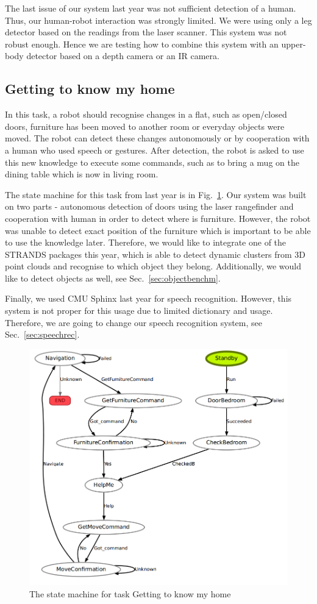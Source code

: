 The last issue of our system last year was not sufficient detection of a human. Thus, our human-robot interaction was strongly limited. 
We were using only a leg detector based on the readings from the laser scanner. 
This system was not robust enough. 
Hence we are testing how to combine this system with an upper-body detector based on a depth camera or an IR camera.

\subsection{Getting to know my home}

In this task, a robot should recognise changes in a flat, such as open/closed doors, furniture has been moved to another room or everyday objects were moved. 
The robot can detect these changes autonomously or by cooperation with a human who used speech or gestures.
After detection, the robot is asked to use this new knowledge to execute some commands, such as to bring a mug on the dining table which is now in living room.

The state machine for this task from last year is in Fig.~\ref{fig:st1}.
Our system was built on two parts - autonomous detection of doors using the laser rangefinder and cooperation with human in order to detect where is furniture. 
 However, the robot was unable to detect exact position of the furniture which is important to be able to use the knowledge later. 
Therefore, we would like to integrate one of the STRANDS packages this year, which is able to detect dynamic clusters from 3D point clouds and recognise to which object they belong. 
Additionally, we would like to detect objects as well, see Sec.~\ref{sec:objectbenchm}.

Finally, we used CMU Sphinx last year for speech recognition. 
However, this system is not proper for this usage due to limited dictionary and usage. 
Therefore, we are going to change our speech recognition system, see Sec.~\ref{sec:speechrec}.

\begin{figure}[!htb]
\centering
\includegraphics[width=3.in]{statemachine_t1.png}
\caption{The state machine for task Getting to know my home}
\label{fig:st1}
\end{figure}

